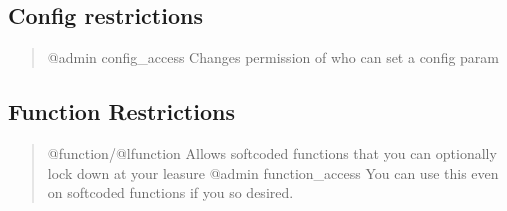 \documentclass[letterpaper,10pt,english]{sphinxmanual}
\begin{document}
\subsection{Config restrictions}
\label{\detokenize{security:config-restrictions}}\begin{quote}

\sphinxAtStartPar
@admin config\_access \sphinxhyphen{} Changes permission of who can set a config param
\end{quote}


\subsection{Function Restrictions}
\label{\detokenize{security:function-restrictions}}\begin{quote}

\sphinxAtStartPar
@function/@lfunction \textendash{} Allows softcoded functions that you can optionally lock down at your leasure
@admin function\_access \textendash{} You can use this even on softcoded functions if you so desired.
\end{quote}
\end{document}
